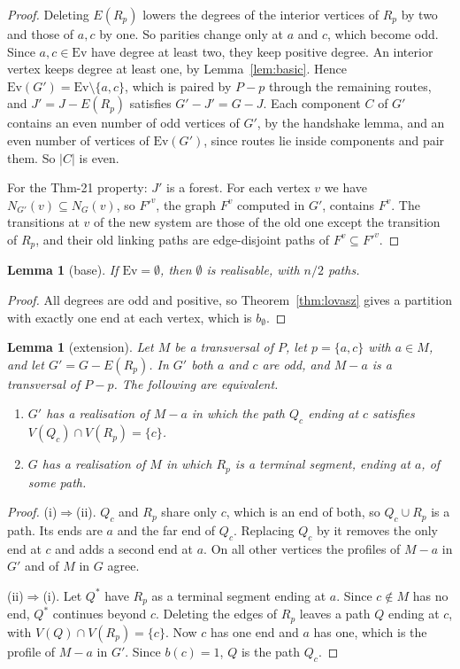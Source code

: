 \documentclass[11pt]{amsart}
\newtheorem{lemma}[theorem]{Lemma}
\theoremstyle{definition}
\newcommand{\Ev}{\mathrm{Ev}}
\begin{document}
\begin{proof}
Deleting $E(R_p)$ lowers the degrees of the interior vertices of $R_p$ by two and those of $a,c$ by one.
So parities change only at $a$ and $c$, which become odd. Since $a,c\in\Ev$ have degree at least two, they
keep positive degree. An interior vertex keeps degree at least one, by Lemma~\ref{lem:basic}. Hence
$\Ev(G')=\Ev\setminus\{a,c\}$, which is paired by $P-p$ through the remaining routes, and $J'=J-E(R_p)$
satisfies $G'-J'=G-J$. Each component $C$ of $G'$ contains an even number of odd vertices of $G'$, by the
handshake lemma, and an even number of vertices of $\Ev(G')$, since routes lie inside components and pair
them. So $|C|$ is even.

For the Thm-21 property: $J'$ is a forest. For each vertex $v$ we have $N_{G'}(v)\subseteq N_G(v)$, so
$F'^v$, the graph $F^v$ computed in $G'$, contains $F^v$. The transitions at $v$ of the new system are
those of the old one except the transition of $R_p$, and their old linking paths are edge-disjoint paths
of $F^v\subseteq F'^v$.
\end{proof}

\begin{lemma}[base]\label{lem:base}
If $\Ev=\emptyset$, then $\emptyset$ is realisable, with $n/2$ paths.
\end{lemma}

\begin{proof}
All degrees are odd and positive, so Theorem~\ref{thm:lovasz} gives a partition with exactly one end at
each vertex, which is $b_\emptyset$.
\end{proof}

\begin{lemma}[extension]\label{lem:ext}
Let $M$ be a transversal of $P$, let $p=\{a,c\}$ with $a\in M$, and let $G'=G-E(R_p)$. In $G'$ both $a$ and
$c$ are odd, and $M-a$ is a transversal of $P-p$. The following are equivalent.
\begin{enumerate}
\item[(i)] $G'$ has a realisation of $M-a$ in which the path $Q_c$ ending at $c$ satisfies
$V(Q_c)\cap V(R_p)=\{c\}$.
\item[(ii)] $G$ has a realisation of $M$ in which $R_p$ is a terminal segment, ending at $a$, of some
path.
\end{enumerate}
\end{lemma}

\begin{proof}
(i)$\Rightarrow$(ii). $Q_c$ and $R_p$ share only $c$, which is an end of both, so $Q_c\cup R_p$ is a path.
Its ends are $a$ and the far end of $Q_c$. Replacing $Q_c$ by it removes the only end at $c$ and adds a
second end at $a$. On all other vertices the profiles of $M-a$ in $G'$ and of $M$ in $G$ agree.

(ii)$\Rightarrow$(i). Let $Q^\ast$ have $R_p$ as a terminal segment ending at $a$. Since $c\notin M$ has no
end, $Q^\ast$ continues beyond $c$. Deleting the edges of $R_p$ leaves a path $Q$ ending at $c$, with
$V(Q)\cap V(R_p)=\{c\}$. Now $c$ has one end and $a$ has one, which is the profile of $M-a$ in $G'$. Since
$b(c)=1$, $Q$ is the path $Q_c$.
\end{proof}
\end{document}
